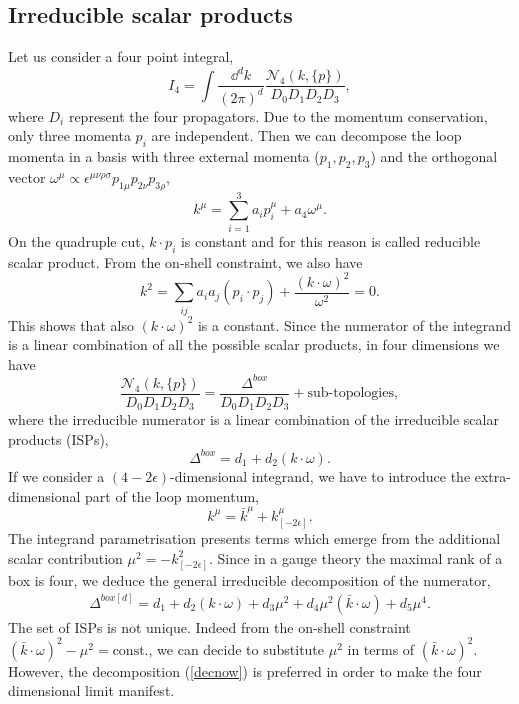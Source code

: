 \subsection{Irreducible scalar products}	\label{sec:ISPs}
Let us consider a four point integral,
$$
	I_4=\int \frac{\dd^{d}k}{(2\pi)^{d}} \frac{\mathcal{N}_4(k,\{p\})}{D_0 D_1 D_2 D_3},
$$
where $D_i$ represent the four propagators. Due to the momentum conservation, only three momenta $p_i$ are independent. Then we can decompose the loop momenta in a basis with three external momenta ($p_1,p_2,p_3$) and the orthogonal vector $\omega^\mu \propto \epsilon^{\mu\nu\rho\sigma} p_{1\mu}p_{2\nu} p_{3\rho}$,
$$
	k^\mu=\sum_{i=1}^3 a_i p_i^\mu + a_4 \omega^\mu.
$$
On the quadruple cut, $k\cdot p_i$ is constant and for this reason is called reducible scalar product. From the on-shell constraint, we also have
$$
	k^2=\sum_{ij} a_i a_j (p_i \cdot p_j)+\frac{(k\cdot \omega)^2}{\omega^2}=0.
$$
This shows that also $(k\cdot \omega)^2$ is a constant. Since the numerator of the integrand is a linear combination of all the possible scalar products, in four dimensions we have
$$
	\frac{\mathcal{N}_4(k,\{p\})}{D_0D_1D_2D_3}=\frac{\Delta^{box}}{D_0D_1D_2D_3}+\text{sub-topologies},
$$
where the irreducible numerator is a linear combination of the irreducible scalar products (ISPs),
$$
	\Delta^{box}=d_1+d_2(k\cdot \omega).
$$
If we consider a $(4-2\epsilon)$-dimensional integrand, we have to introduce the extra-dimensional part of the loop momentum,
$$
	k^\mu=\bar k^\mu+ k^{\mu}_{[-2\epsilon]}.
$$
The integrand parametrisation presents terms which emerge from the additional scalar contribution $\mu^2=-k^2_{[-2\epsilon]}$. Since in a gauge theory the maximal rank of a box is four, we deduce the general irreducible decomposition of the numerator,
\begin{align}
	\Delta^{box[d]}=d_1+d_2(k\cdot \omega)+d_3 \mu^2+d_4 \mu^2(\bar k \cdot \omega)+d_5 \mu^4.	\label{decnow}
\end{align}
The set of ISPs is not unique. Indeed from the on-shell constraint $(\bar k\cdot \omega)^2-\mu^2=\text{const.}$, we can decide to substitute $\mu^2$ in terms of $(\bar k\cdot \omega)^2$. However, the decomposition (\ref{decnow}) is preferred in order to make the four dimensional limit manifest.\\

